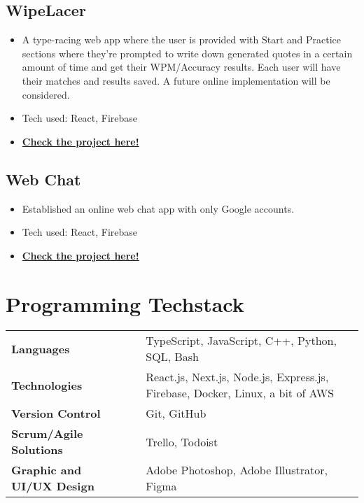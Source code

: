 \documentclass[a4,10pt]{article}
\newenvironment{zitemize}{
\begin{itemize}\itemsep0pt \parskip0pt \parsep1pt}
{\end{itemize}\vspace{-0.5cm}}
\newcommand{\hskills}[1]{
\textbf{\bfseries #1} }
\begin{document}
\subsection*{WipeLacer {\normalsize\normalfont} \hfill} 
    \begin{zitemize}
        \item A type-racing web app where the user is provided with Start and Practice sections where they're prompted to write down generated quotes in a certain amount of time and get their WPM/Accuracy results. Each user will have their matches and results saved. A future online implementation will be considered.
        \item Tech used: React, Firebase
         \item \href{https://wipelacer.vercel.app}{\small \textbf {Check the project here!}}
    \end{zitemize}

\subsection*{Web Chat {\normalsize\normalfont} \hfill} 
    \begin{zitemize}
        \item Established an online web chat app with only Google accounts.
        \item Tech used: React, Firebase
        \item \href{https://webchat-37001.firebaseapp.com}{\small \textbf {Check the project here!}}
        
    \end{zitemize}
   


\section{Programming Techstack}
\begin{tabular}{p{11em} p{1em} p{43em}}
\hskills{Languages }&  & TypeScript, JavaScript, C++, Python, SQL, Bash \\
\hskills{Technologies} &  & React.js, Next.js, Node.js, Express.js, Firebase, Docker, Linux, a bit of AWS \\
\hskills{Version Control} &  & Git, GitHub \\
\hskills{Scrum/Agile Solutions} &  & Trello, Todoist \\
\hskills{Graphic and UI/UX Design} &  & Adobe Photoshop, Adobe Illustrator, Figma
\\
\end{tabular}
\end{document}
